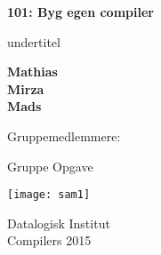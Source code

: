 \begin{titlepage}
    \begin{center}
        \vspace*{1cm}

        \Huge
        \textbf{101: Byg egen compiler}

        \vspace{0.5cm}
        \LARGE
        undertitel

        \vspace{1.5cm}

        \textbf{Mathias}\\
        \textbf{Mirza}\\
        \textbf{Mads }\\

        \vspace{1.5cm}

        Gruppemedlemmere:\\

        \vspace{0.5cm}



        \vfill

        Gruppe Opgave

        \vspace{0.8cm}

        \texttt{[image: sam1]}

        \Large
        Datalogisk Institut\\
        Compilers 2015

    \end{center}
\end{titlepage} 